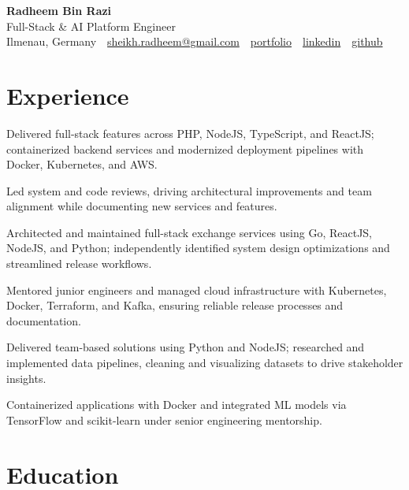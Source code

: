 \documentclass[11pt,a4paper]{resume}
\makeatletter
\newcommand{\Portfolio}{https://radheem.github.io/my-cv}
\newcommand{\PortfolioText}{portfolio}
\newcommand{\GitHub}{https://github.com/radheem}
\newcommand{\LinkedIn}{https://www.linkedin.com/in/radheem-razi}
\newcommand{\Email}{sheikh.radheem@gmail.com}
\makeatother
\begin{document}
\begin{center}
  {\huge\bfseries Radheem Bin Razi}\\[3pt]
  {\large Full-Stack \& AI Platform Engineer}\\[6pt]
  \small
  Ilmenau, Germany \,\textbar\,
  \href{mailto:\Email}{\Email} \,\textbar\,
  \href{\Portfolio}{\PortfolioText} \,\textbar\,
  \href{\LinkedIn}{linkedin} \,\textbar\,
  \href{\GitHub}{github}
\end{center}
\vspace{2pt}

\section{Experience}

\bullets
  \item Delivered full-stack features across PHP, NodeJS, TypeScript, and ReactJS; containerized backend services and modernized deployment pipelines with Docker, Kubernetes, and AWS.
  \item Led system and code reviews, driving architectural improvements and team alignment while documenting new services and features.
\bulletsend
\vspace{3pt}
\bullets
  \item Architected and maintained full-stack exchange services using Go, ReactJS, NodeJS, and Python; independently identified system design optimizations and streamlined release workflows.
  \item Mentored junior engineers and managed cloud infrastructure with Kubernetes, Docker, Terraform, and Kafka, ensuring reliable release processes and documentation.
\bulletsend
\vspace{3pt}
\bullets
  \item Delivered team-based solutions using Python and NodeJS; researched and implemented data pipelines, cleaning and visualizing datasets to drive stakeholder insights.
  \item Containerized applications with Docker and integrated ML models via TensorFlow and scikit-learn under senior engineering mentorship.
\bulletsend
\vspace{3pt}

\section{Education}
\end{document}
